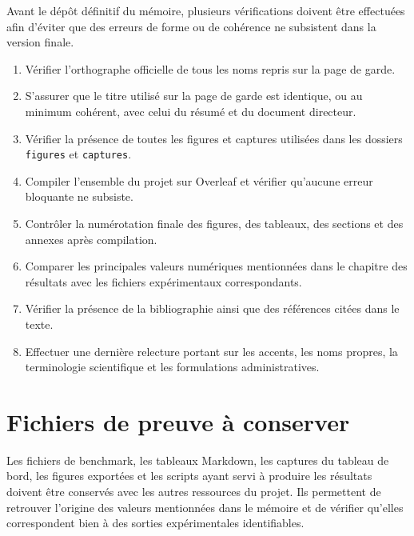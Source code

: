 Avant le dépôt définitif du mémoire, plusieurs vérifications doivent être effectuées afin d'éviter que des erreurs de forme ou de cohérence ne subsistent dans la version finale.

\begin{enumerate}

\item Vérifier l'orthographe officielle de tous les noms repris sur la page de garde.

\item S'assurer que le titre utilisé sur la page de garde est identique, ou au minimum cohérent, avec celui du résumé et du document directeur.

\item Vérifier la présence de toutes les figures et captures utilisées dans les dossiers \texttt{figures} et \texttt{captures}.

\item Compiler l'ensemble du projet sur Overleaf et vérifier qu'aucune erreur bloquante ne subsiste.

\item Contrôler la numérotation finale des figures, des tableaux, des sections et des annexes après compilation.

\item Comparer les principales valeurs numériques mentionnées dans le chapitre des résultats avec les fichiers expérimentaux correspondants.

\item Vérifier la présence de la bibliographie ainsi que des références citées dans le texte.

\item Effectuer une dernière relecture portant sur les accents, les noms propres, la terminologie scientifique et les formulations administratives.

\end{enumerate}


\section{Fichiers de preuve à conserver}

Les fichiers de benchmark, les tableaux Markdown, les captures du tableau de bord, les figures exportées et les scripts ayant servi à produire les résultats doivent être conservés avec les autres ressources du projet. Ils permettent de retrouver l'origine des valeurs mentionnées dans le mémoire et de vérifier qu'elles correspondent bien à des sorties expérimentales identifiables.

